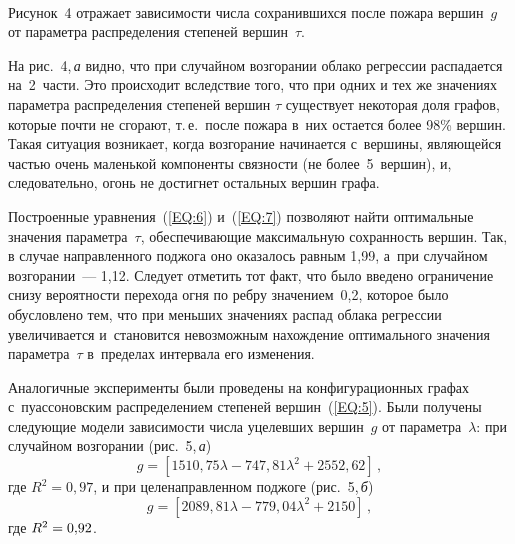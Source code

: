 \begin{multicols}{2}
\begin{figure*}[b] %
\vspace*{1pt}
 \begin{center}
 \mbox{%
 \epsfxsize=163.589mm
 }
\end{center}
 \vspace*{-9pt}
\end{figure*}

Рисунок~4 отражает зависимости чис\-ла сохранившихся после пожара вершин~$g$ от
параметра распределения степеней вершин~$\tau$.

На рис.~4,\,\textit{а} видно, что при случайном возгорании облако регрессии распадается на~2~части. Это происходит вследствие того, что при одних и тех же значениях параметра распределения
степеней вершин $\tau$ существует некоторая доля графов, которые почти не сгорают,
 т.\,е.\ после
пожара в~них остается более 98\% вершин. Такая ситуация возникает, когда возгорание начинается
с~вершины, являющейся \mbox{частью} очень маленькой компоненты связности (не более~5~вершин), 
и, следовательно, огонь не достигнет остальных вершин графа.

Построенные уравнения~(\ref{EQ:6}) и~(\ref{EQ:7}) позволяют найти оптимальные значения
параметра~$\tau$, обеспечивающие максимальную сохранность вершин. Так, в случае направленного поджога оно
оказалось равным 1,99, а~при случайном возгорании~--- 1,12.
Следует отметить тот факт, что
было введено ограничение снизу вероятности перехода огня по реб\-ру значением~0,2,
которое
было обусловлено тем, что при меньших значениях распад облака регрессии
увеличивается
и~становится невозможным нахождение оптимального значения параметра~$\tau$
в~пределах интервала его изменения.

Аналогичные эксперименты были проведены на конфигурационных графах с~пуассоновским
распределением степеней вершин~(\ref{EQ:5}). Были получены следующие модели
зависимости
чис\-ла уцелевших вершин~$g$ от параметра~$\lambda$: при случайном возгорании
(рис.~5,\,\textit{а})
\begin{equation}
\label{EQ:8}
g = \left[1510{,}75\lambda - 747{,}81\lambda^2 + 2552{,}62\right]\,,
\end{equation}
где $R^2=0{,}97$, и при целенаправленном поджоге (рис.~5,\,\textit{б}) 
\begin{equation}
\label{EQ:9}
g = \left[2089{,}81\lambda - 779{,}04\lambda^2 + 2150\right]\,,
\end{equation}
где $R^2\hm=0{,}92$.




\end{multicols}
